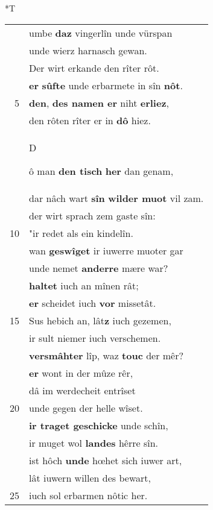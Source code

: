 \documentclass[8pt,a4paper,notitlepage]{article}
\begin{document}
\begin{table}[ht]
\begin{minipage}[t]{0.5\linewidth}
\end{minipage}
\hspace{0.5cm}
\begin{minipage}[t]{0.5\linewidth}
\small
\begin{center}*T
\end{center}
\begin{tabular}{rl}
 & umbe \textbf{daz} vingerlîn unde vürspan\\ 
 & unde wierz harnasch gewan.\\ 
 & Der wirt erkande den rîter rôt.\\ 
 & \textbf{er} \textbf{sûfte} unde erbarmete in sîn \textbf{nôt}.\\ 
5 & \textbf{den}, \textbf{des namen er} niht \textbf{erliez},\\ 
 & den rôten rîter er in \textbf{dô} hiez.\\ 
 & \begin{large}D\end{large}ô man \textbf{den tisch} \textbf{her} dan genam,\\ 
 & dar nâch wart \textbf{sîn} \textbf{wilder muot} vil zam.\\ 
 & der wirt sprach zem gaste sîn:\\ 
10 & "ir redet als ein kindelîn.\\ 
 & wan \textbf{geswîget} ir iuwerre muoter gar\\ 
 & unde nemet \textbf{anderre} mære war?\\ 
 & \textbf{haltet} iuch an mînen rât;\\ 
 & \textbf{er} scheidet iuch \textbf{vor} missetât.\\ 
15 & Sus hebich an, lât\textbf{z} iuch gezemen,\\ 
 & ir sult niemer iuch verschemen.\\ 
 & \textbf{versmâhter} lîp, waz \textbf{touc} der mêr?\\ 
 & \textbf{er} wont in der mûze rêr,\\ 
 & dâ im werdecheit entrîset\\ 
20 & unde gegen der helle wîset.\\ 
 & \textbf{ir traget geschicke} unde schîn,\\ 
 & ir muget wol \textbf{landes} hêrre sîn.\\ 
 & ist hôch \textbf{unde} hœhet sich iuwer art,\\ 
 & lât iuwern willen des bewart,\\ 
25 & iuch sol erbarmen nôtic her.\\ 

\end{tabular}
\end{minipage}
\end{table}
\end{document}
